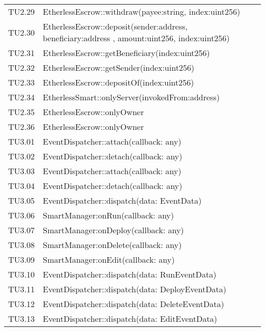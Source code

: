 \begin{longtable}{
		>{\centering}p{}
		>{\centering\arraybackslash}p{}}
	TU2.29 &  EtherlessEscrow::withdraw(payee:string, index:uint256)  \tabularnewline
	
	TU2.30 &  EtherlessEscrow::deposit(sender:address, beneficiary:address , amount:uint256, index:uint256)  \tabularnewline
	
	TU2.31 &  EtherlessEscrow::getBeneficiary(index:uint256)  \tabularnewline
	
	TU2.32 &  EtherlessEscrow::getSender(index:uint256)  \tabularnewline
	
	TU2.33 &  EtherlessEscrow::depositOf(index:uint256)  \tabularnewline
	
	TU2.34 &  EtherlessSmart::onlyServer(invokedFrom:address)  \tabularnewline
	
	TU2.35 &  EtherlessEscrow::onlyOwner  \tabularnewline
	
	TU2.36 &  EtherlessEscrow::onlyOwner  \tabularnewline
	
	TU3.01 & EventDispatcher::attach(callback: any) \\
	
	TU3.02 & EventDispatcher::detach(callback: any) \\
	
	TU3.03 & EventDispatcher::attach(callback: any) \\
	
	TU3.04 & EventDispatcher::detach(callback: any) \\
	
	TU3.05 & EventDispatcher::dispatch(data: EventData) \\
	
	TU3.06 & SmartManager:onRun(callback: any) \\
	
	TU3.07 & SmartManager:onDeploy(callback: any) \\
	
	TU3.08 & SmartManager:onDelete(callback: any) \\
	
	TU3.09 & SmartManager:onEdit(callback: any) \\
	
	TU3.10 & EventDispatcher::dispatch(data: RunEventData) \\
	
	TU3.11 & EventDispatcher::dispatch(data: DeployEventData) \\
	
	TU3.12 & EventDispatcher::dispatch(data: DeleteEventData) \\
	
	TU3.13 & EventDispatcher::dispatch(data: EditEventData) \\
	

\end{longtable}
